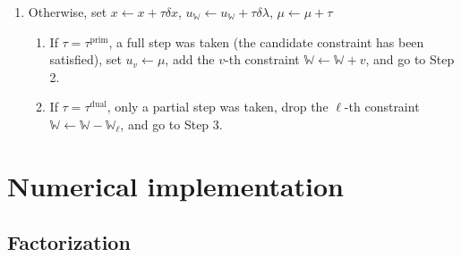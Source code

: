 \documentclass[12pt,a4paper]{article}
\begin{document}
\begin{enumerate}
\item Otherwise, set $x \leftarrow x + \tau \delta x$, $u_{\mathbb{W}}
  \leftarrow u_{\mathbb{W}} + \tau \delta \lambda$, $\mu \leftarrow \mu + \tau$

  \begin{enumerate}
  \item If $\tau = \tau^{\text{prim}}$, a full step was taken (the candidate
    constraint has been satisfied), set $u_v \leftarrow \mu$, add the $v$-th
    constraint $\mathbb{W} \leftarrow \mathbb{W} + v$, and go to
    Step 2.
  \item If $\tau = \tau^{\text{dual}}$, only a partial step was taken, drop the
    $\ell$-th constraint $\mathbb{W} \leftarrow \mathbb{W} - \mathbb{W}_{\ell}$,
    and go to Step 3.
  \end{enumerate}

\end{enumerate}

\section{Numerical implementation}

\subsection{Factorization}
\end{document}
